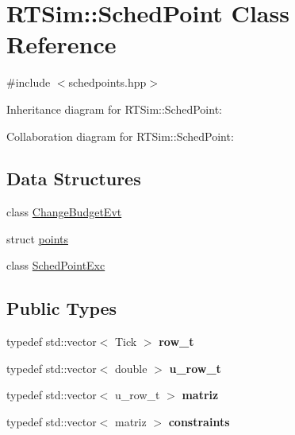 \hypertarget{classRTSim_1_1SchedPoint}{}\section{R\+T\+Sim\+:\+:Sched\+Point Class Reference}
\label{classRTSim_1_1SchedPoint}


{\ttfamily \#include $<$schedpoints.\+hpp$>$}



Inheritance diagram for R\+T\+Sim\+:\+:Sched\+Point\+:


Collaboration diagram for R\+T\+Sim\+:\+:Sched\+Point\+:
\subsection*{Data Structures}
\begin{DoxyCompactItemize}
\item 
class \hyperlink{classRTSim_1_1SchedPoint_1_1ChangeBudgetEvt}{Change\+Budget\+Evt}
\item 
struct \hyperlink{structRTSim_1_1SchedPoint_1_1points}{points}
\item 
class \hyperlink{classRTSim_1_1SchedPoint_1_1SchedPointExc}{Sched\+Point\+Exc}
\end{DoxyCompactItemize}
\subsection*{Public Types}
\begin{DoxyCompactItemize}
\item 
typedef std\+::vector$<$ Tick $>$ {\bfseries row\+\_\+t}\hypertarget{classRTSim_1_1SchedPoint_abc4f2aa09024fcdf08c1bd53cdd370a8}{}\label{classRTSim_1_1SchedPoint_abc4f2aa09024fcdf08c1bd53cdd370a8}

\item 
typedef std\+::vector$<$ double $>$ {\bfseries u\+\_\+row\+\_\+t}\hypertarget{classRTSim_1_1SchedPoint_acb7d13093b7a376365fbdb82212fa46c}{}\label{classRTSim_1_1SchedPoint_acb7d13093b7a376365fbdb82212fa46c}

\item 
typedef std\+::vector$<$ u\+\_\+row\+\_\+t $>$ {\bfseries matriz}\hypertarget{classRTSim_1_1SchedPoint_a7ccf9d339f3bd1f7916ffea559a740dc}{}\label{classRTSim_1_1SchedPoint_a7ccf9d339f3bd1f7916ffea559a740dc}

\item 
typedef std\+::vector$<$ matriz $>$ {\bfseries constraints}\hypertarget{classRTSim_1_1SchedPoint_a0256a22da1c5030d5f057f49d5d6ece5}{}\label{classRTSim_1_1SchedPoint_a0256a22da1c5030d5f057f49d5d6ece5}

\end{DoxyCompactItemize}

